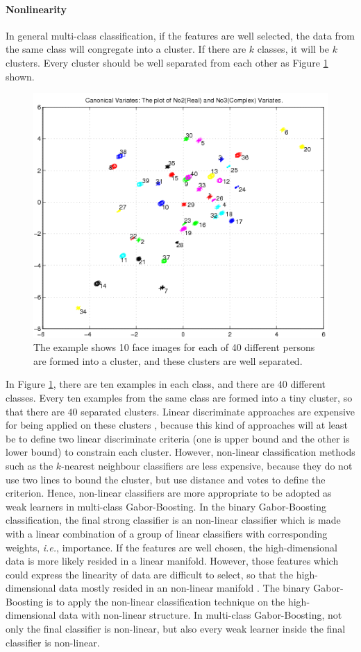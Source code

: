 \paragraph{Nonlinearity}
In general multi-class classification, if the features are well selected, the data from the same class will congregate into a cluster. If there are $k$ classes, it will be $k$ clusters. Every cluster should be well separated from each other as \mbox{Figure} \ref{fig:clusterperclass} shown. 
\begin{figure}[ht]
 \begin{center}
  \includegraphics[width=0.66\columnwidth]{ch5/figures/Canonical_Variate_2_3.png}
  \caption{The example shows 10 face images for each of 40 different persons are formed into a cluster, and these clusters are well separated. }
\label{fig:clusterperclass}
 \end{center}
\end{figure} 
In \mbox{Figure} \ref{fig:clusterperclass}, there are ten examples in each class, and there are $40$ different classes. Every ten examples from the same class are formed into a tiny cluster, so that there are $40$ separated clusters. Linear discriminate approaches are expensive for being applied on these clusters , because this kind of approaches will at least be to define two linear discriminate criteria (one is upper bound and the other is lower bound) to constrain each cluster. However, non-linear classification methods such as the $k$-nearest neighbour classifiers are less expensive, because they do not use two lines to bound the cluster, but use distance and votes to define the criterion. Hence, non-linear classifiers are more appropriate to be adopted as weak learners in multi-class Gabor-Boosting. In the binary Gabor-Boosting classification, the final strong classifier is an non-linear classifier which is made with a linear combination of a group of linear classifiers with corresponding weights, \textit{i.e.}, importance. If the features are well chosen, the high-dimensional data is more likely resided in a linear manifold. However, those features which could express the linearity of data are difficult to select, so that the high-dimensional data mostly resided in an non-linear manifold \cite{Tenenbaum2000}. The binary Gabor-Boosting is to apply the non-linear classification technique on the high-dimensional data with non-linear structure. In multi-class Gabor-Boosting, not only the final classifier is non-linear, but also every weak learner inside the final classifier is non-linear. 

